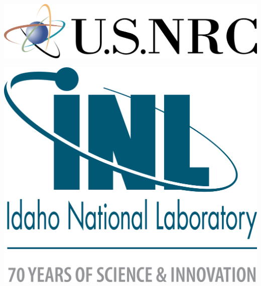 {\begin{center}
\begin{minipage}{0.7\linewidth}
\begin{tcolorbox}[colback=white, colframe=black, width=\linewidth, height=.275\linewidth, boxrule=1pt]
\begin{center}
\begin{minipage}{.3\linewidth}
\begin{center}
                        \includegraphics[width = \linewidth]{img/nrc.png}
                        \newline\par\vspace{-1.5em}
                        \includegraphics[height = .5\linewidth]{img/inl.png}
                    \end{center}
                \end{minipage}
            \end{center}
        \end{tcolorbox}
    \end{minipage}

    \begin{tcolorbox}[colback=white, colframe=black, width=0.9\textwidth, arc=6pt, boxrule=1pt]
        
        
    \end{tcolorbox}
\end{center}
}{
}